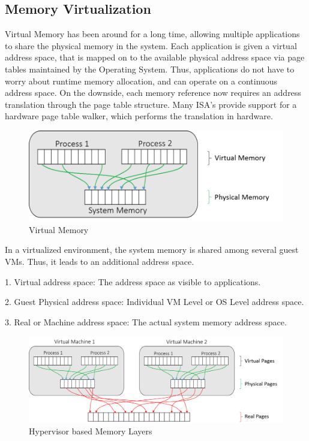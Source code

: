 \subsection{Memory Virtualization}
Virtual Memory has been around for a long time, allowing multiple applications to share the physical memory in the system. Each application is given a virtual address space, that is mapped on to the available physical address space via page tables maintained by the Operating System. Thus, applications do not have to worry about runtime memory allocation, and can operate on a continuous address space. On the downside, each memory reference now requires an address translation through the page table structure. Many ISA’s provide support for a hardware page table walker, which performs the translation in hardware. 

\setlength{\belowcaptionskip}{-10pt}

\begin{figure}[H]
  \centering
  \includegraphics[scale=0.8]{figures/virt_mem.png}
  \caption{Virtual Memory}
  \label{fig:virt_mem}
\end{figure}
In a virtualized environment, the system memory is shared among several guest VMs. Thus, it leads to an additional address space.

1. Virtual address space: The address space as visible to applications.

2. Guest Physical address space: Individual VM Level or OS Level address space.

3. Real or Machine address space: The actual system memory address space.

\setlength{\belowcaptionskip}{-10pt}

\begin{figure}[H]
  \centering
  \includegraphics[scale=0.65]{figures/hyp_mem_map_comp.png}
  \caption{Hypervisor based Memory Layers}
  \label{fig:hyper_mem}
\end{figure}

